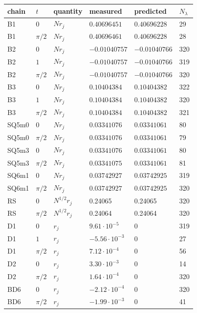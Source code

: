 \begin{tabular}{llllll}
\hline
chain & $t$ & quantity & measured & predicted & $N_\lambda$\\
\hline
B1 & $0$ & $N r_j$ & $0.40696451$ & $0.40696228$ & 29\\
B1 & $\pi/2$ & $N r_j$ & $0.40696461$ & $0.40696228$ & 28\\
B2 & $0$ & $N r_j$ & $-0.01040757$ & $-0.01040766$ & 320\\
B2 & $1$ & $N r_j$ & $-0.01040757$ & $-0.01040766$ & 319\\
B2 & $\pi/2$ & $N r_j$ & $-0.01040757$ & $-0.01040766$ & 320\\
B3 & $0$ & $N r_j$ & $0.10404384$ & $0.10404382$ & 322\\
B3 & $1$ & $N r_j$ & $0.10404384$ & $0.10404382$ & 320\\
B3 & $\pi/2$ & $N r_j$ & $0.10404384$ & $0.10404382$ & 321\\
SQ5m0 & $0$ & $N r_j$ & $0.03341076$ & $0.03341061$ & 80\\
SQ5m0 & $\pi/2$ & $N r_j$ & $0.03341076$ & $0.03341061$ & 79\\
SQ5m3 & $0$ & $N r_j$ & $0.03341076$ & $0.03341061$ & 80\\
SQ5m3 & $\pi/2$ & $N r_j$ & $0.03341075$ & $0.03341061$ & 81\\
SQ6m1 & $0$ & $N r_j$ & $0.03742927$ & $0.03742925$ & 319\\
SQ6m1 & $\pi/2$ & $N r_j$ & $0.03742927$ & $0.03742925$ & 320\\
RS & $0$ & $N^{1/2} r_j$ & 0.24065 & 0.24065 & 320\\
RS & $\pi/2$ & $N^{1/2} r_j$ & 0.24064 & 0.24064 & 320\\
D1 & $0$ & $r_j$ & $9.61\cdot10^{-5}$ & $0$ & 319\\
D1 & $1$ & $r_j$ & $-5.56\cdot10^{-3}$ & $0$ & 27\\
D1 & $\pi/2$ & $r_j$ & $7.12\cdot10^{-4}$ & $0$ & 56\\
D2 & $0$ & $r_j$ & $3.30\cdot10^{-3}$ & $0$ & 14\\
D2 & $\pi/2$ & $r_j$ & $1.64\cdot10^{-4}$ & $0$ & 320\\
BD6 & $0$ & $r_j$ & $-2.12\cdot10^{-4}$ & $0$ & 320\\
BD6 & $\pi/2$ & $r_j$ & $-1.99\cdot10^{-3}$ & $0$ & 41\\
\hline
\end{tabular}
